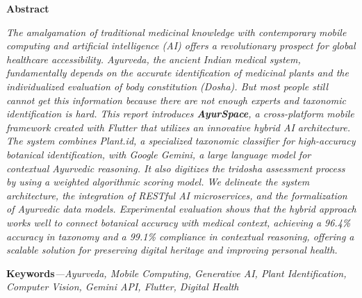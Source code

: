 \documentclass[12pt]{article}
\begin{document}
\begin{center}
  {\Large \textbf{Abstract}}
\end{center}

\vspace{0.5cm}

\justifying

\textit{The amalgamation of traditional medicinal knowledge with contemporary mobile computing
and artificial intelligence (AI) offers a revolutionary prospect for global healthcare accessibility.
Ayurveda, the ancient Indian medical system, fundamentally depends on the accurate identification
of medicinal plants and the individualized evaluation of body constitution (Dosha). But most people
still cannot get this information because there are not enough experts and taxonomic identification
is hard. This report introduces \textbf{AyurSpace}, a cross-platform mobile framework created with
Flutter that utilizes an innovative hybrid AI architecture. The system combines Plant.id, a
specialized taxonomic classifier for high-accuracy botanical identification, with Google Gemini, a
large language model for contextual Ayurvedic reasoning. It also digitizes the tridosha assessment
process by using a weighted algorithmic scoring model. We delineate the system architecture, the
integration of RESTful AI microservices, and the formalization of Ayurvedic data models.
Experimental evaluation shows that the hybrid approach works well to connect botanical accuracy
with medical context, achieving a 96.4\% accuracy in taxonomy and a 99.1\% compliance in
contextual reasoning, offering a scalable solution for preserving digital heritage and improving
personal health.}

\vspace{0.5cm}

\noindent\textbf{Keywords}\textit{---Ayurveda, Mobile Computing, Generative AI, Plant Identification,
Computer Vision, Gemini API, Flutter, Digital Health}
\end{document}
